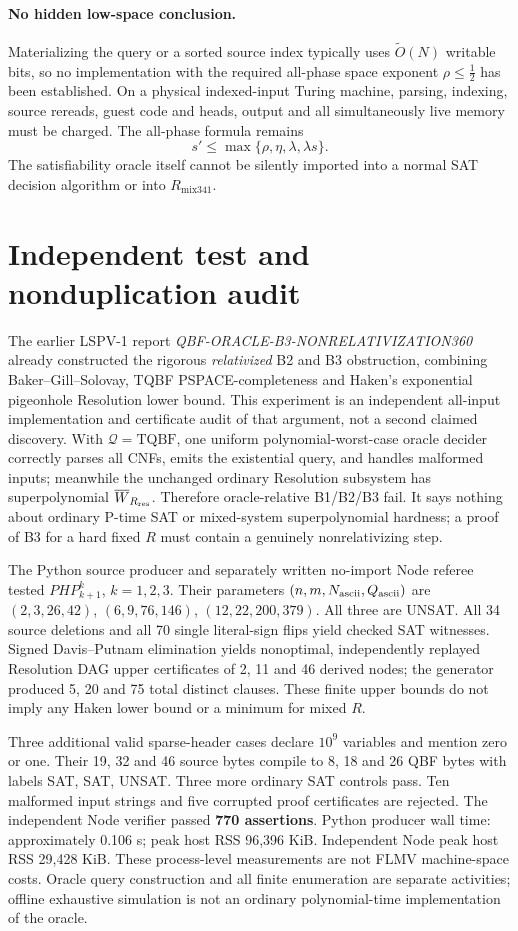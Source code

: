 \documentclass[11pt]{article}
\begin{document}
\paragraph{No hidden low-space conclusion.}
Materializing the query or a sorted source index typically uses $\tilde O(N)$ writable bits, so no implementation with the required all-phase space exponent $\rho\le\tfrac12$ has been established. On a physical indexed-input Turing machine, parsing, indexing, source rereads, guest code and heads, output and all simultaneously live memory must be charged. The all-phase formula remains
\[
s'\le\max\{\rho,\eta,\lambda,\lambda s\}.
\]
The satisfiability oracle itself cannot be silently imported into a normal SAT decision algorithm or into $R_{\mathrm{mix341}}$.

\section*{Independent test and nonduplication audit}
The earlier LSPV-1 report \emph{QBF-ORACLE-B3-NONRELATIVIZATION360} already constructed the rigorous \emph{relativized} B2 and B3 obstruction, combining Baker--Gill--Solovay, TQBF PSPACE-completeness and Haken's exponential pigeonhole Resolution lower bound. This experiment is an independent all-input implementation and certificate audit of that argument, not a second claimed discovery. With $\mathcal Q=\mathrm{TQBF}$, one uniform polynomial-worst-case oracle decider correctly parses all CNFs, emits the existential query, and handles malformed inputs; meanwhile the unchanged ordinary Resolution subsystem has superpolynomial $\overline W_{R_{\rm res}}$. Therefore oracle-relative B1/B2/B3 fail. It says nothing about ordinary P-time SAT or mixed-system superpolynomial hardness; a proof of B3 for a hard fixed $R$ must contain a genuinely nonrelativizing step.

The Python source producer and separately written no-import Node referee tested $PHP_{k+1}^{k}$, $k=1,2,3$. Their parameters $(n,m,N_{\rm ascii},Q_{\rm ascii})$ are $(2,3,26,42)$, $(6,9,76,146)$, $(12,22,200,379)$. All three are UNSAT. All 34 source deletions and all 70 single literal-sign flips yield checked SAT witnesses. Signed Davis--Putnam elimination yields nonoptimal, independently replayed Resolution DAG upper certificates of 2, 11 and 46 derived nodes; the generator produced 5, 20 and 75 total distinct clauses. These finite upper bounds do not imply any Haken lower bound or a minimum for mixed $R$.

Three additional valid sparse-header cases declare $10^9$ variables and mention zero or one. Their 19, 32 and 46 source bytes compile to 8, 18 and 26 QBF bytes with labels SAT, SAT, UNSAT. Three more ordinary SAT controls pass. Ten malformed input strings and five corrupted proof certificates are rejected. The independent Node verifier passed \textbf{770 assertions}. Python producer wall time: approximately 0.106 s; peak host RSS 96,396 KiB. Independent Node peak host RSS 29,428 KiB. These process-level measurements are not FLMV machine-space costs. Oracle query construction and all finite enumeration are separate activities; offline exhaustive simulation is not an ordinary polynomial-time implementation of the oracle.
\end{document}
